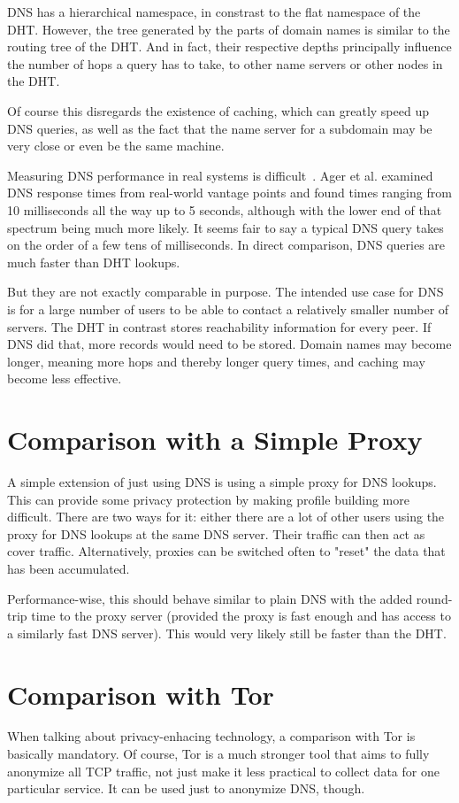 DNS has a hierarchical namespace, in constrast to the flat namespace of the DHT.
However, the tree generated by the parts of domain names is similar to the
routing tree of the DHT. And in fact, their respective depths principally
influence the number of hops a query has to take, to other name servers or other
nodes in the DHT.

Of course this disregards the existence of caching, which can greatly speed up
DNS queries, as well as the fact that the name server for a subdomain may be
very close or even be the same machine.

Measuring DNS performance in real systems is
difficult~\cite{liston2002diversity}. Ager et al.\cite{ager2010comparing}
examined DNS response times from real-world vantage points and found times
ranging from 10 milliseconds all the way up to 5 seconds, although with the
lower end of that spectrum being much more likely. It seems fair to say a
typical DNS query takes on the order of a few tens of milliseconds. In direct
comparison, DNS queries are much faster than DHT lookups.

But they are not exactly comparable in purpose. The intended use case for DNS is
for a large number of users to be able to contact a relatively smaller number of
servers. The DHT in contrast stores reachability information for every peer. If
DNS did that, more records would need to be stored. Domain names may become
longer, meaning more hops and thereby longer query times, and caching may become
less effective.

\section{Comparison with a Simple Proxy}
A simple extension of just using DNS is using a simple proxy for DNS lookups.
This can provide some privacy protection by making profile building more
difficult. There are two ways for it: either there are a lot of other users
using the proxy for DNS lookups at the same DNS server. Their traffic can then
act as cover traffic. Alternatively, proxies can be switched often to "reset"
the data that has been accumulated.

Performance-wise, this should behave similar to plain DNS with the added
round-trip time to the proxy server (provided the proxy is fast enough and has
access to a similarly fast DNS server). This would very likely still be faster
than the DHT.

\section{Comparison with Tor}
When talking about privacy-enhacing technology, a comparison with Tor is
basically mandatory. Of course, Tor is a much stronger tool that aims to fully
anonymize all TCP traffic, not just make it less practical to collect data for
one particular service. It can be used just to anonymize DNS, though.

